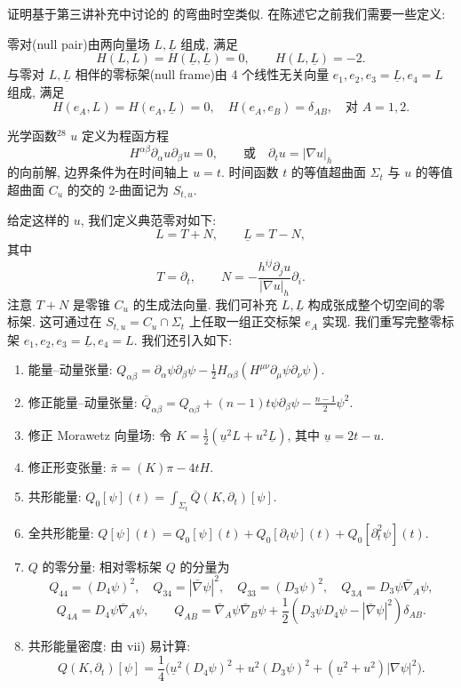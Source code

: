 证明基于第三讲补充中讨论的 的弯曲时空类似. 在陈述它之前我们需要一些定义:
\setcounter{mtthm}{12}
\begin{definition}\label{def:3.13}
零对(null pair)由两向量场 $L,\underline{L}$ 组成, 满足
\[
H(L,L)=H(\underline{L},\underline{L})=0,\qquad H(L,\underline{L})=-2.
\]
与零对 $L, \underline{L}$ 相伴的零标架(null frame)由 4 个线性无关向量 $e_1, e_2, e_3 = \underline{L}, e_4 = L$ 组成, 满足
\[
H(e_{A},L)=H(e_{A},\underline{L})=0,\quad H(e_{A},e_{B})=\delta_{A B},\quad\text{对 }A=1,2.
\]
\end{definition}

\setcounter{mtthm}{13}
\begin{definition}\label{def:3.14}
光学函数$^{28}$ $u$ 定义为程函方程
\[
H^{\alpha\beta}\partial_{\alpha}u\partial_{\beta}u=0,\qquad\text{或}\quad\partial_{t}u=|\nabla u|_{h}
\]
的向前解, 边界条件为在时间轴上 $u = t$. 时间函数 $t$ 的等值超曲面 $\Sigma_t$ 与 $u$ 的等值超曲面 $C_u$ 的交的 2-曲面记为 $S_{t,u}$.\end{definition}

\setcounter{mtthm}{14}
\begin{definition}\label{def:3.15}
给定这样的 $u$, 我们定义典范零对如下:
\[
L=T+N,\qquad \underline{L}=T-N,
\]
其中
\[
T=\partial_{t},\qquad N=-\frac{h^{i j}\partial_{j}u}{|\nabla u|_{h}}\partial_{i}.
\]
注意 $T + N$ 是零锥 $C_u$ 的生成法向量. 我们可补充 $L, \underline{L}$ 构成张成整个切空间的零标架. 这可通过在 $S_{t,u} = C_u \cap \Sigma_t$ 上任取一组正交标架 $e_A$ 实现. 我们重写完整零标架 $e_1, e_2, e_3 = \underline{L}, e_4 = L$.
我们还引入如下:
\begin{enumerate}[label=\roman*)]
\item 能量--动量张量: $Q_{\alpha\beta} = \partial_{\alpha}\psi\partial_{\beta}\psi - \tfrac{1}{2}H_{\alpha\beta}(H^{\mu\nu}\partial_{\mu}\psi\partial_{\nu}\psi)$.
\item 修正能量--动量张量: $\bar{Q}_{\alpha\beta} = Q_{\alpha\beta} + (n-1)t\psi\partial_{\beta}\psi - \frac{n-1}{2}\psi^{2}$.
\item 修正 Morawetz 向量场: 令 $K = \tfrac{1}{2}(\underline{u}^2L + u^2\underline{L})$, 其中 $\underline{u} = 2t - u$.
\item 修正形变张量: $\bar{\pi} = (K)\pi - 4tH$.
\item 共形能量: $Q_0[\psi](t) = \int_{\Sigma_t} \bar{Q}(K, \partial_t)[\psi]$.
\item 全共形能量: $Q[\psi](t) = Q_0[\psi](t) + Q_0[\partial_t\psi](t) + Q_0[\partial_t^2\psi](t)$.
\item $Q$ 的零分量: 相对零标架 $Q$ 的分量为
\[
Q_{44}=(D_{4}\psi)^{2},\quad Q_{34}=|\bar{\nabla}\psi|^{2},\quad
Q_{33}=(D_{3}\psi)^{2},\quad Q_{3A}=D_{3}\psi\bar{\nabla}_{A}\psi,
\]
\[
Q_{4A}=D_{4}\psi\bar{\nabla}_{A}\psi,\qquad Q_{A B}=\bar{\nabla}_{A}\psi\bar{\nabla}_{B}\psi+\frac{1}{2}(D_{3}\psi D_{4}\psi-|\bar{\nabla}\psi|^{2})\delta_{A B}.
\]
\item 共形能量密度: 由 vii) 易计算:
\[
Q(K,\partial_{t})[\psi]=\frac{1}{4}\bigl(\underline{u}^{2}(D_{4}\psi)^{2}+u^{2}(D_{3}\psi)^{2}+(\underline{u}^{2}+u^{2})|\nabla\psi|^{2}\bigr).
\]
\end{enumerate}
\end{definition}

